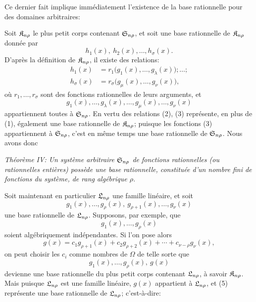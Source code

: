 Ce dernier fait implique immédiatement l'existence de la base rationnelle pour des domaines arbitraires:

Soit $\mathfrak{K}_{n\rho}$ le plus petit corps contenant $\mathfrak{S}_{n\rho}$, et soit une base rationnelle de $\mathfrak{K}_{n\rho}$ donnée par
\begin{equation}
  h_1(x),\ h_2(x),\ldots,h_\sigma(x).
\tag{1}
\end{equation}
D'après la définition de $\mathfrak{K}_{n\rho}$, il existe des relations:
\begin{equation}
\begin{aligned}
 h_1(x)&=r_1\bigl(g_1(x),\ldots,g_\lambda(x)\bigr);\ldots;\\
 h_\sigma(x)&=r_\sigma\bigl(g_\mu(x),\ldots,g_\nu(x)\bigr),
\end{aligned}
\tag{2}
\end{equation}
où $r_1,
\ldots,r_\sigma$ sont des fonctions rationnelles de leurs arguments, et
\begin{equation}
  g_1(x),\ldots,g_\lambda(x),\ldots,
  g_\mu(x),\ldots,g_\nu(x)
\tag{3}
\end{equation}
appartiennent toutes à $\mathfrak{S}_{n\rho}$. En vertu des relations (2), (3) représente, en plus de (1), également une base rationnelle de $\mathfrak{K}_{n\rho}$; puisque les fonctions (3) appartiennent à $\mathfrak{S}_{n\rho}$, c'est en même temps une base rationnelle de $\mathfrak{S}_{n\rho}$. Nous avons donc

\emph{Théorème IV: Un système arbitraire $\mathfrak{S}_{n\rho}$ de fonctions rationnelles (ou rationnelles entières) possède une base rationnelle, constituée d'un nombre fini de fonctions du système, de rang algébrique $\rho$.}

Soit maintenant en particulier $\mathfrak{L}_{n\rho}$ une famille linéaire, et soit
\begin{equation}
  g_1(x),\ldots,g_\rho(x),\ g_{\rho+1}(x),\ldots,g_\nu(x)
\tag{4}
\end{equation}
une base rationnelle de $\mathfrak{L}_{n\rho}$. Supposons, par exemple, que
\[
  g_1(x),\ldots,g_\rho(x)
\]
soient algébriquement indépendantes. Si l'on pose alors
\[
  g(x)=c_1g_{\rho+1}(x)+c_2g_{\rho+2}(x)+\cdots+c_{\nu-\rho}g_\nu(x),
\]
on peut choisir les $c_i$ comme nombres de $\Omega$ de telle sorte que
\begin{equation}
  g_1(x),\ldots,g_\rho(x),\ g(x)
\tag{5}
\end{equation}
devienne une base rationnelle du plus petit corps contenant $\mathfrak{L}_{n\rho}$, à savoir $\mathfrak{K}_{n\rho}$. Mais puisque $\mathfrak{L}_{n\rho}$ est une famille linéaire, $g(x)$ appartient à $\mathfrak{L}_{n\rho}$, et (5) représente une base rationnelle de $\mathfrak{L}_{n\rho}$; c'est-à-dire:

